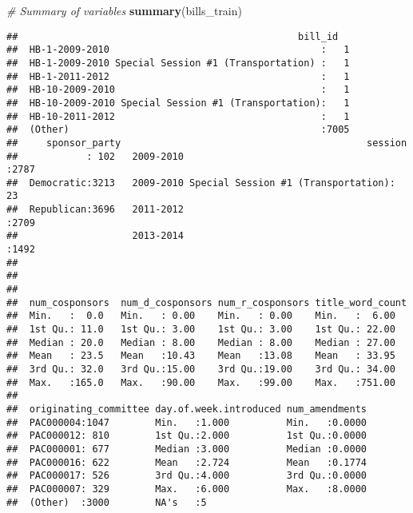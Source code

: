 \documentclass[]{article}
\newenvironment{Shaded}{\begin{snugshade}}{\end{snugshade}}
\newcommand{\KeywordTok}[1]{\textcolor[rgb]{0.13,0.29,0.53}{\textbf{#1}}}
\newcommand{\CommentTok}[1]{\textcolor[rgb]{0.56,0.35,0.01}{\textit{#1}}}
\newcommand{\NormalTok}[1]{#1}
\begin{document}
\begin{Shaded}
\begin{Highlighting}[]
\CommentTok{# Summary of variables}
\KeywordTok{summary}\NormalTok{(bills_train)}
\end{Highlighting}
\end{Shaded}

\begin{verbatim}
##                                                 bill_id    
##  HB-1-2009-2010                                     :   1  
##  HB-1-2009-2010 Special Session #1 (Transportation) :   1  
##  HB-1-2011-2012                                     :   1  
##  HB-10-2009-2010                                    :   1  
##  HB-10-2009-2010 Special Session #1 (Transportation):   1  
##  HB-10-2011-2012                                    :   1  
##  (Other)                                            :7005  
##     sponsor_party                                           session    
##            : 102   2009-2010                                    :2787  
##  Democratic:3213   2009-2010 Special Session #1 (Transportation):  23  
##  Republican:3696   2011-2012                                    :2709  
##                    2013-2014                                    :1492  
##                                                                        
##                                                                        
##                                                                        
##  num_cosponsors  num_d_cosponsors num_r_cosponsors title_word_count
##  Min.   :  0.0   Min.   : 0.00    Min.   : 0.00    Min.   :  6.00  
##  1st Qu.: 11.0   1st Qu.: 3.00    1st Qu.: 3.00    1st Qu.: 22.00  
##  Median : 20.0   Median : 8.00    Median : 8.00    Median : 27.00  
##  Mean   : 23.5   Mean   :10.43    Mean   :13.08    Mean   : 33.95  
##  3rd Qu.: 32.0   3rd Qu.:15.00    3rd Qu.:19.00    3rd Qu.: 34.00  
##  Max.   :165.0   Max.   :90.00    Max.   :99.00    Max.   :751.00  
##                                                                    
##  originating_committee day.of.week.introduced num_amendments  
##  PAC000004:1047        Min.   :1.000          Min.   :0.0000  
##  PAC000012: 810        1st Qu.:2.000          1st Qu.:0.0000  
##  PAC000001: 677        Median :3.000          Median :0.0000  
##  PAC000016: 622        Mean   :2.724          Mean   :0.1774  
##  PAC000017: 526        3rd Qu.:4.000          3rd Qu.:0.0000  
##  PAC000007: 329        Max.   :6.000          Max.   :8.0000  
##  (Other)  :3000        NA's   :5                              

\end{verbatim}
\end{document}
